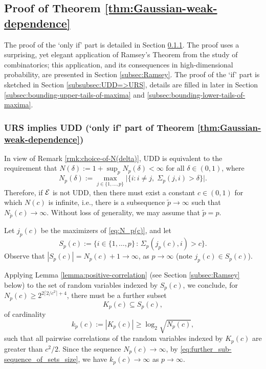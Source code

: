 \subsection{Proof of Theorem \ref{thm:Gaussian-weak-dependence}}
\label{sec:proof-UDD-URS-outline}

The proof of the `only if' part is detailed in Section \ref{subsubsec:URS=>UDD}. 
The proof uses a surprising, yet elegant application of Ramsey's Theorem from the study of combinatorics; this application, and its consequences in high-dimensional probability, are presented in Section \ref{subsec:Ramsey}.
The proof of the `if' part is sketched in Section \ref{subsubsec:UDD=>URS},
details are filled in later in Section \ref{subsec:bounding-upper-tails-of-maxima} and \ref{subsec:bounding-lower-tails-of-maxima}.

\subsubsection{{\bf URS implies UDD (`only if' part of Theorem \ref{thm:Gaussian-weak-dependence})}} \label{subsubsec:URS=>UDD}
In view of Remark \ref{rmk:choice-of-N(delta)}, UDD is equivalent to the requirement that
$N(\delta) := 1+\sup_{p} N_p(\delta) < \infty$ for all $\delta\in(0,1)$,
where 
\begin{equation} \label{eq:N_p(c)}
    N_p(\delta) := \max_{j\in\{1,\ldots,p\}} \Big|\{i:i\neq j,\;\Sigma_p(j,i) > \delta\}\Big|.
\end{equation}
Therefore, if ${\cal E}$ is not UDD, then there must exist a constant $c\in (0,1)$ for which $N(c)$ is infinite, i.e., there is a subsequence $\widetilde p\to\infty$ such that $N_{\widetilde p}(c) \to \infty$.
Without loss of generality,  we may assume that $\widetilde{p}=p$.

Let $j_p(c)$ be the maximizers of \eqref{eq:N_p(c)}, and let
\begin{equation} \label{eq:sub-sequence_of_sets}
S_p(c):= \{ i\in\{1,\dots,p\}\, :\, \Sigma_p(j_p(c), i) > c \}.%
\end{equation}
Observe that $|S_p(c)| = N_p(c)+1 \to \infty$, as $p\to\infty$ 
(note $j_p(c) \in S_{p}(c)$).

Applying Lemma \ref{lemma:positive-correlation} (see Section \ref{subsec:Ramsey} below) to the set of random variables indexed by $S_p(c)$, we conclude, for $N_p(c) \ge 2^{2\lceil2/c^2\rceil+4}$, there must be a further subset 
\begin{equation} \label{eq:further_sub-sequence_of_sets}
  K_p(c) \subseteq S_p(c),
\end{equation}
of cardinality 
\begin{equation} \label{eq:further_sub-sequence_of_sets_size}
k_p(c) := \left|K_p(c)\right| \ge \log_2{\sqrt{N_p(c)}},
\end{equation}
such that all pairwise correlations of the random variables indexed by $K_p(c)$ are greater than $c^2/2$.
Since the sequence $N_p(c)\to\infty$, by \eqref{eq:further_sub-sequence_of_sets_size}, we have $k_p(c)\to\infty$ as $p\to\infty$.

